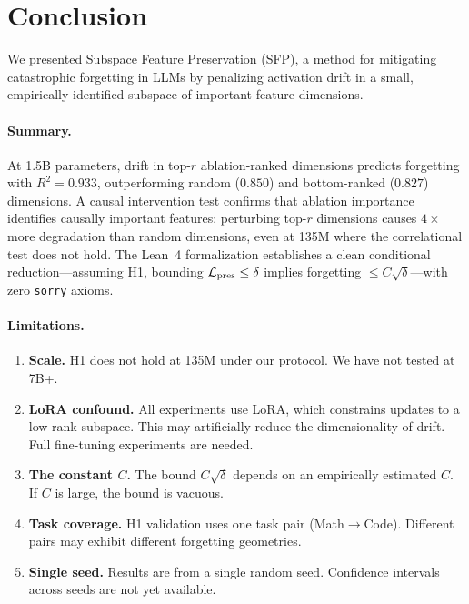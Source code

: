 \section{Conclusion}
\label{sec:conclusion}

We presented Subspace Feature Preservation (SFP), a method for mitigating catastrophic forgetting in LLMs by penalizing activation drift in a small, empirically identified subspace of important feature dimensions.

\paragraph{Summary.}
At 1.5B parameters, drift in top-$r$ ablation-ranked dimensions predicts forgetting with $R^2 = 0.933$, outperforming random ($0.850$) and bottom-ranked ($0.827$) dimensions.
A causal intervention test confirms that ablation importance identifies causally important features: perturbing top-$r$ dimensions causes $4\times$ more degradation than random dimensions, even at 135M where the correlational test does not hold.
The Lean~4 formalization establishes a clean conditional reduction---assuming H1, bounding $\mathcal{L}_{\text{pres}} \leq \delta$ implies forgetting $\leq C\sqrt{\delta}$---with zero \texttt{sorry} axioms.

\paragraph{Limitations.}
\begin{enumerate}
    \item \textbf{Scale.} H1 does not hold at 135M under our protocol. We have not tested at 7B+.

    \item \textbf{LoRA confound.} All experiments use LoRA, which constrains updates to a low-rank subspace. This may artificially reduce the dimensionality of drift. Full fine-tuning experiments are needed.

    \item \textbf{The constant $C$.} The bound $C\sqrt{\delta}$ depends on an empirically estimated $C$. If $C$ is large, the bound is vacuous.

    \item \textbf{Task coverage.} H1 validation uses one task pair (Math$\to$Code). Different pairs may exhibit different forgetting geometries.

    \item \textbf{Single seed.} Results are from a single random seed. Confidence intervals across seeds are not yet available.
\end{enumerate}

